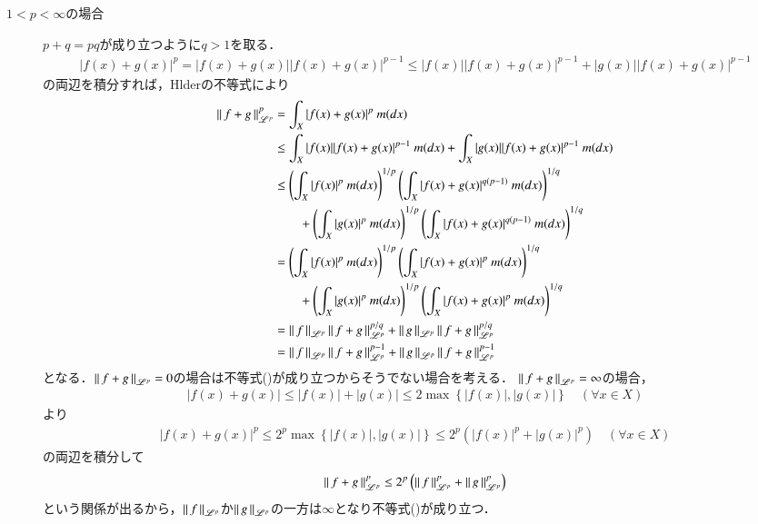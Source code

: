 \begin{prf}
\begin{description}
		\item[$1 < p < \infty$の場合]
			$p + q = pq$が成り立つように$q > 1$を取る．
			\begin{align}
				|f(x) + g(x)|^p = |f(x) + g(x)||f(x) + g(x)|^{p-1} \leq |f(x)||f(x) + g(x)|^{p-1} + |g(x)||f(x) + g(x)|^{p-1}
			\end{align}
			の両辺を積分すれば，Hlderの不等式により
			\begin{align}
				\left\|\, f+g\, \right\|_{\mathscr{L}^p}^p &= \int_{X} |f(x) + g(x)|^p\ m(dx) \\
				&\leq \int_{X} |f(x)||f(x) + g(x)|^{p-1}\ m(dx) + \int_{X} |g(x)||f(x) + g(x)|^{p-1}\ m(dx) \\
				&\leq \left( \int_{X} |f(x)|^p\ m(dx) \right)^{1/p} \left( \int_{X} |f(x) + g(x)|^{q(p-1)}\ m(dx) \right)^{1/q} \\
					&\qquad + \left( \int_{X} |g(x)|^p\ m(dx) \right)^{1/p} \left( \int_{X} |f(x) + g(x)|^{q(p-1)}\ m(dx) \right)^{1/q} \\
				&= \left( \int_{X} |f(x)|^p\ m(dx) \right)^{1/p} \left( \int_{X} |f(x) + g(x)|^p\ m(dx) \right)^{1/q} \\
					&\qquad + \left( \int_{X} |g(x)|^p\ m(dx) \right)^{1/p} \left( \int_{X} |f(x) + g(x)|^p\ m(dx) \right)^{1/q} \\
				&= \left\|\, f\, \right\|_{\mathscr{L}^p}\left\|\, f+g\, \right\|_{\mathscr{L}^p}^{p/q} + \left\|\, g\, \right\|_{\mathscr{L}^p}\left\|\, f+g\, \right\|_{\mathscr{L}^p}^{p/q} \\
				&= \left\|\, f\, \right\|_{\mathscr{L}^p}\left\|\, f+g\, \right\|_{\mathscr{L}^p}^{p-1} + \left\|\, g\, \right\|_{\mathscr{L}^p}\left\|\, f+g\, \right\|_{\mathscr{L}^p}^{p-1}
				\label{Minkowski_1}
			\end{align}
			となる．$\left\|\, f+g\, \right\|_{\mathscr{L}^p} = 0$の場合は不等式()が成り立つからそうでない場合を考える．
			$\left\|\, f+g\, \right\|_{\mathscr{L}^p} = \infty$の場合，
			\begin{align}
				|f(x) + g(x)| \leq |f(x)| + |g(x)| \leq 2 \max{}{\left\{ |f(x)|,|g(x)| \right\}} \quad (\forall x \in X)
			\end{align}
			より
			\begin{align}
				|f(x) + g(x)|^p \leq 2^p \max{}{\left\{ |f(x)|,|g(x)| \right\}} \leq 2^p \left( |f(x)|^p + |g(x)|^p \right) \quad (\forall x \in X)
			\end{align}
			の両辺を積分して
			\begin{align}
				\left\|\, f+g\, \right\|_{\mathscr{L}^p}^p \leq 2^p \left( \left\|\, f\, \right\|_{\mathscr{L}^p}^p + \left\|\, g\, \right\|_{\mathscr{L}^p}^p \right)
			\end{align}
			という関係が出るから，$\left\|\, f\, \right\|_{\mathscr{L}^p}$か$\left\|\, g\, \right\|_{\mathscr{L}^p}$の一方は$\infty$となり不等式()が成り立つ．

\end{description}
\end{prf}
